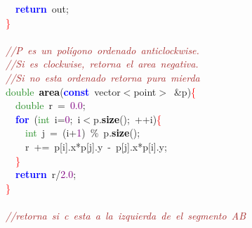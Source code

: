 {{\mbox{}\ \ \textbf{\textcolor{Blue}{return}}\ out\textcolor{BrickRed}{;} \\
\mbox{}\textcolor{Red}{\}} \\
\mbox{} \\
\mbox{}\textit{\textcolor{Brown}{//P\ es\ un\ polígono\ ordenado\ anticlockwise.}} \\
\mbox{}\textit{\textcolor{Brown}{//Si\ es\ clockwise,\ retorna\ el\ area\ negativa.}} \\
\mbox{}\textit{\textcolor{Brown}{//Si\ no\ esta\ ordenado\ retorna\ pura\ mierda}} \\
\mbox{}\textcolor{ForestGreen}{double}\ \textbf{\textcolor{Black}{area}}\textcolor{BrickRed}{(}\textbf{\textcolor{Blue}{const}}\ vector\textcolor{BrickRed}{$<$}point\textcolor{BrickRed}{$>$}\ \textcolor{BrickRed}{\&}p\textcolor{BrickRed}{)}\textcolor{Red}{\{} \\
\mbox{}\ \ \textcolor{ForestGreen}{double}\ r\ \textcolor{BrickRed}{=}\ \textcolor{Purple}{0.0}\textcolor{BrickRed}{;} \\
\mbox{}\ \ \textbf{\textcolor{Blue}{for}}\ \textcolor{BrickRed}{(}\textcolor{ForestGreen}{int}\ i\textcolor{BrickRed}{=}\textcolor{Purple}{0}\textcolor{BrickRed}{;}\ i\textcolor{BrickRed}{$<$}p\textcolor{BrickRed}{.}\textbf{\textcolor{Black}{size}}\textcolor{BrickRed}{();}\ \textcolor{BrickRed}{++}i\textcolor{BrickRed}{)}\textcolor{Red}{\{} \\
\mbox{}\ \ \ \ \textcolor{ForestGreen}{int}\ j\ \textcolor{BrickRed}{=}\ \textcolor{BrickRed}{(}i\textcolor{BrickRed}{+}\textcolor{Purple}{1}\textcolor{BrickRed}{)}\ \textcolor{BrickRed}{\%}\ p\textcolor{BrickRed}{.}\textbf{\textcolor{Black}{size}}\textcolor{BrickRed}{();} \\
\mbox{}\ \ \ \ r\ \textcolor{BrickRed}{+=}\ p\textcolor{BrickRed}{[}i\textcolor{BrickRed}{].}x\textcolor{BrickRed}{*}p\textcolor{BrickRed}{[}j\textcolor{BrickRed}{].}y\ \textcolor{BrickRed}{-}\ p\textcolor{BrickRed}{[}j\textcolor{BrickRed}{].}x\textcolor{BrickRed}{*}p\textcolor{BrickRed}{[}i\textcolor{BrickRed}{].}y\textcolor{BrickRed}{;} \\
\mbox{}\ \ \textcolor{Red}{\}} \\
\mbox{}\ \ \textbf{\textcolor{Blue}{return}}\ r\textcolor{BrickRed}{/}\textcolor{Purple}{2.0}\textcolor{BrickRed}{;} \\
\mbox{}\textcolor{Red}{\}} \\
\mbox{} \\
\mbox{}\textit{\textcolor{Brown}{//retorna\ si\ c\ esta\ a\ la\ izquierda\ de\ el\ segmento\ AB}} \\
}}
